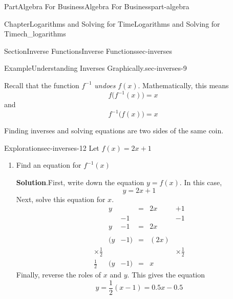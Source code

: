 \documentclass[oneside,10pt,]{tufte-book}
\newcommand{\blocktitlefont}{\relax}
\numberwithin{equation}{chapter}
\newcommand{\amp}{&}
\begin{document}
\begin{partptx}{Part}{Algebra For Business}{}{Algebra For Business}{}{}{part-algebra}
\begin{chapterptx}{Chapter}{Logarithms and Solving for Time}{}{Logarithms and Solving for Time}{}{}{ch_logarithms}
\begin{sectionptx}{Section}{Inverse Functions}{}{Inverse Functions}{}{}{sec-inverses}
\begin{example}{Example}{Understanding Inverses Graphically.}{sec-inverses-9}
\begin{image}{0}{1}{0}{}
{
}%
\end{image}%
\end{example}
Recall that the function \(f^{-1}\) \emph{undoes} \(f(x)\). Mathematically, this means%
\begin{equation*}
f\Big( f^{-1}(x) \Big) = x
\end{equation*}
and%
\begin{equation*}
f^{-1}\Big( f(x) \Big) = x
\end{equation*}
%
\par
Finding inverses and solving equations are two sides of the same coin.%
\begin{exploration}{Exploration}{}{sec-inverses-12}%
Let \(f(x) = 2x+1\)%
\begin{enumerate}[font=\bfseries,label=(\alph*),ref=\alph*]%
\item{}Find an equation for \(f^{-1}(x)\)%
\par\smallskip%
\noindent\textbf{\blocktitlefont Solution}.\hypertarget{sec-inverses-12-2-2}{}\quad{}First, write down the equation \(y=f(x)\).  In this case,%
\begin{equation*}
y = 2x + 1
\end{equation*}
Next, solve this equation for \(x\).%
\begin{align*}
\amp y \amp \amp= \amp 2x \amp + 1 \\
\amp   \amp -1 \amp \amp \amp -1 \\
\amp y \amp -1 \amp= \amp 2x \amp  \\
\amp  \amp  \amp  \amp  \amp \\
\amp (y \amp -1)\amp= \amp (2x) \amp  \\
\times\frac{1}{2} \amp   \amp \amp \amp \amp \times\frac{1}{2} \\
\frac{1}{2}\amp (y \amp -1)\amp= \amp x \amp  
\end{align*}
Finally, reverse the roles of \(x\) and \(y\).  This gives the equation%
\begin{equation*}
y = \frac{1}{2} ( x - 1) = 0.5 x -0.5
\end{equation*}

\end{enumerate}
\end{exploration}
\end{sectionptx}
\end{chapterptx}
\end{partptx}
\end{document}
